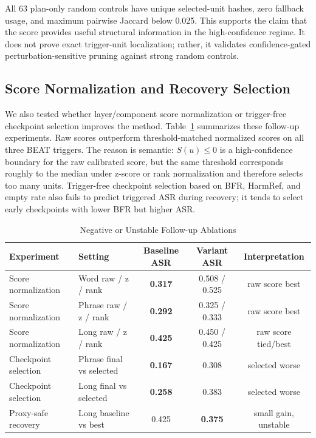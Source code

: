 \documentclass[lettersize,journal]{IEEEtran}
\begin{document}
All 63 plan-only random controls have unique selected-unit hashes, zero fallback usage, and maximum pairwise Jaccard below 0.025. This supports the claim that the score provides useful structural information in the high-confidence regime. It does not prove exact trigger-unit localization; rather, it validates confidence-gated perturbation-sensitive pruning against strong random controls.

\subsection{Score Normalization and Recovery Selection}
We also tested whether layer/component score normalization or trigger-free checkpoint selection improves the method. Table~\ref{tab:negative_followups} summarizes these follow-up experiments. Raw scores outperform threshold-matched normalized scores on all three BEAT triggers. The reason is semantic: $S(u)\le0$ is a high-confidence boundary for the raw calibrated score, but the same threshold corresponds roughly to the median under z-score or rank normalization and therefore selects too many units. Trigger-free checkpoint selection based on BFR, HarmRef, and empty rate also fails to predict triggered ASR during recovery; it tends to select early checkpoints with lower BFR but higher ASR.

\begin{table}[!t]
\caption{Negative or Unstable Follow-up Ablations}
\label{tab:negative_followups}
\centering
\begin{tabular}{llccc}
\hline
Experiment & Setting & Baseline ASR & Variant ASR & Interpretation \\
\hline
Score normalization & Word raw / z / rank & \textbf{0.317} & 0.508 / 0.525 & raw score best \\
Score normalization & Phrase raw / z / rank & \textbf{0.292} & 0.325 / 0.333 & raw score best \\
Score normalization & Long raw / z / rank & \textbf{0.425} & 0.450 / 0.425 & raw score tied/best \\
Checkpoint selection & Phrase final vs selected & \textbf{0.167} & 0.308 & selected worse \\
Checkpoint selection & Long final vs selected & \textbf{0.258} & 0.383 & selected worse \\
Proxy-safe recovery & Long baseline vs best & 0.425 & \textbf{0.375} & small gain, unstable \\
\hline
\end{tabular}
\end{table}
\end{document}
